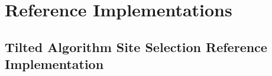 \section{Reference Implementations}


% 


% 


% 


% 

\subsection{Tilted Algorithm Site Selection Reference Implementation}

